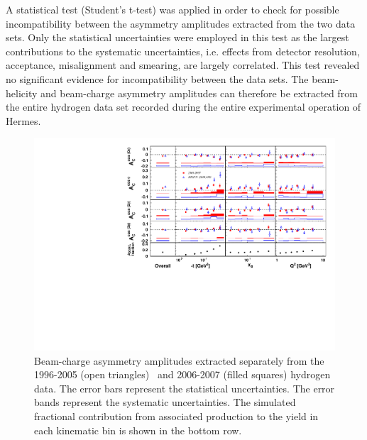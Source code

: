 A statistical test (Student's t-test) was applied in order to check for possible incompatibility between the asymmetry amplitudes extracted from the two data sets. Only the statistical uncertainties were employed in this test as the largest contributions to the systematic uncertainties, i.e. effects from detector resolution, acceptance, misalignment and smearing, are largely correlated. This test revealed no significant evidence for incompatibility between the data sets. The beam-helicity and beam-charge asymmetry amplitudes can therefore be extracted from the entire hydrogen data set recorded during the entire experimental operation of H{\sc ermes}.
\begin{figure}
\begin{center}
 \includegraphics[width=15cm,keepaspectratio]{bca_sep}
  \caption{Beam-charge asymmetry amplitudes extracted separately from the 1996-2005 (open triangles)~\cite{Air09} and 2006-2007 (filled squares) hydrogen data.
The error bars represent the statistical uncertainties. The error bands represent the systematic uncertainties. The simulated fractional contribution from associated production to the yield in each kinematic bin is shown in the bottom row.}
 \label{release_bca_0607}
\end{center}
 \end{figure}

